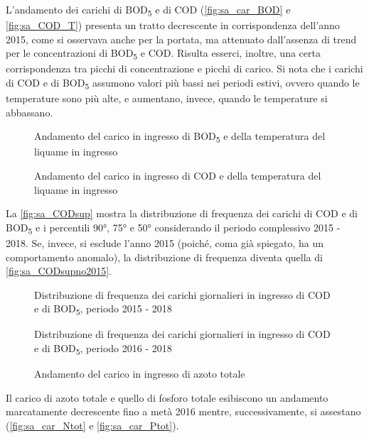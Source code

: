 L'andamento dei carichi di BOD\textsubscript{5} e di COD (\autoref{fig:sa_car_BOD} e \autoref{fig:sa_COD_T}) presenta un tratto decrescente in corrispondenza dell'anno 2015, come si osservava anche per la portata, ma attenuato dall'assenza di trend per le concentrazioni di BOD\textsubscript{5} e COD. Risulta esserci, inoltre, una certa corrispondenza tra picchi di concentrazione e picchi di carico.
Si nota che i carichi di COD e di BOD\textsubscript{5} assumono valori più bassi nei periodi estivi, ovvero quando le temperature sono più alte, e aumentano, invece, quando le temperature si abbassano.
\begin{figure}[H]
	\centering
	\caption{Andamento del carico in ingresso di BOD\textsubscript{5} e della temperatura del liquame in ingresso}
	\label{fig:sa_car_BOD}
\end{figure}
\begin{figure}[H]
	\centering
	\caption{Andamento del carico in ingresso di COD e della temperatura del liquame in ingresso}
	\label{fig:sa_COD_T}
\end{figure}
La \autoref{fig:sa_CODsup} mostra la distribuzione di frequenza dei carichi di COD e di BOD\textsubscript{5} e i percentili 90°, 75° e 50° considerando il periodo complessivo 2015 - 2018. Se, invece, si esclude l'anno 2015 (poiché, coma già spiegato, ha un comportamento anomalo), la distribuzione di frequenza diventa quella di \autoref{fig:sa_CODsupno2015}.
\begin{figure}[H]
	\centering
	\caption{Distribuzione di frequenza dei carichi giornalieri in ingresso di COD e di BOD\textsubscript{5}, periodo 2015 - 2018}
	\label{fig:sa_CODsup}
\end{figure}
\begin{figure}[H]
	\centering
	\caption{Distribuzione di frequenza dei carichi giornalieri in ingresso di COD e di BOD\textsubscript{5}, periodo 2016 - 2018}
	\label{fig:sa_CODsupno2015}
\end{figure}
\begin{figure}[H]
	\centering
	\caption{Andamento del carico in ingresso di azoto totale}
	\label{fig:sa_car_Ntot}
\end{figure}

Il carico di azoto totale e quello di fosforo totale esibiscono un andamento marcatamente decrescente fino a metà 2016 mentre, successivamente, si assestano (\autoref{fig:sa_car_Ntot} e \autoref{fig:sa_car_Ptot}).

